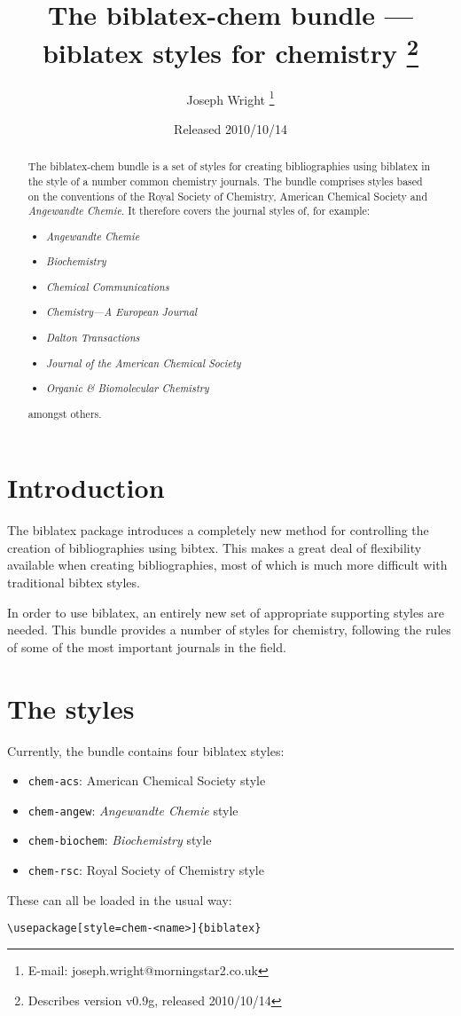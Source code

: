\documentclass[a4paper]{article}
\title{The \textsf{biblatex-chem} bundle --- 
  \textsf{biblatex} styles for chemistry%
  \thanks{Describes version v0.9g, released 2010/10/14}}
\author{Joseph Wright%
  \thanks{E-mail: joseph.wright@morningstar2.co.uk}}
\date{Released 2010/10/14}
\begin{document}
\maketitle
\begin{abstract}
The \textsf{biblatex-chem} bundle is a set of styles for 
creating bibliographies using \textsf{biblatex} in the style of
a number common chemistry journals.  The bundle comprises styles
based on the conventions of the Royal Society of Chemistry, 
American Chemical Society and 	\emph{Angewandte Chemie}. It
therefore covers the journal styles of, for example:
\begin{itemize}
  \item \emph{Angewandte Chemie}
  \item \emph{Biochemistry}
  \item \emph{Chemical Communications}
  \item \emph{Chemistry---A European Journal}
  \item \emph{Dalton Transactions}
  \item \emph{Journal of the American Chemical Society}
  \item \emph{Organic \& Biomolecular Chemistry}
\end{itemize}
amongst others.
\end{abstract}

\begin{multicols}{2}
  \tableofcontents
\end{multicols}

\section{Introduction}
The \textsf{biblatex} package introduces a completely new method
for controlling the creation of bibliographies using
\textsf{bibtex}. This makes a great deal of flexibility 
available when creating bibliographies, most of which is much 
more difficult with traditional \textsf{bibtex} styles.

In order to use \textsf{biblatex}, an entirely new set of 
appropriate supporting styles are needed. This bundle provides a
number of styles for chemistry, following the rules of some of 
the most important journals in the field. 

\section{The styles}

Currently, the bundle contains four \textsf{biblatex} styles:
\begin{itemize}
  \item \texttt{chem-acs}: American Chemical Society style
  \item \texttt{chem-angew}: \emph{Angewandte Chemie} style
  \item \texttt{chem-biochem}: \emph{Biochemistry} style
  \item \texttt{chem-rsc}: Royal Society of Chemistry style
\end{itemize}
These can all be loaded in the usual way:
\begin{verbatim}
\usepackage[style=chem-<name>]{biblatex}
\end{verbatim}
\end{document}
